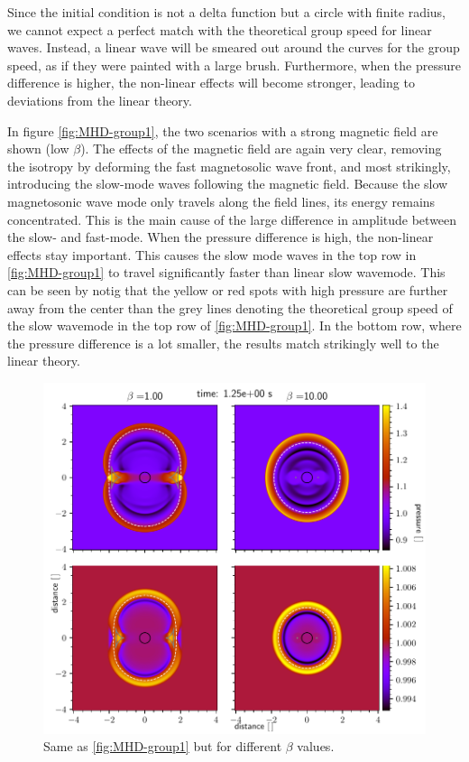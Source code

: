 Since the initial condition is not a delta function but a circle with finite radius, we cannot expect a perfect match with the theoretical group speed for linear waves.
Instead, a linear wave will be smeared out around the curves for the group speed, as if they were painted with a large brush.
Furthermore, when the pressure difference is higher, the non-linear effects will become stronger, leading to deviations from the linear theory.

In figure \cref{fig:MHD-group1}, the two scenarios with a strong magnetic field are shown (low $\beta$).
The effects of the magnetic field are again very clear, removing the isotropy by deforming the fast magnetosolic wave front, and most strikingly, introducing the slow-mode waves following the magnetic field.
Because the slow magnetosonic wave mode only travels along the field lines, its energy remains concentrated. This is the main cause of the large difference in amplitude between the slow- and fast-mode.
When the pressure difference is high, the non-linear effects stay important. 
This causes the slow mode waves in the top row in \cref{fig:MHD-group1} to travel significantly faster than linear slow wavemode.
This can be seen by notig that the yellow or red spots with high pressure are further away from the center than the grey lines denoting the theoretical group speed of the slow wavemode in the top row of \cref{fig:MHD-group1}.
In the bottom row, where the pressure difference is a lot smaller, the results match strikingly well to the linear theory.

\begin{figure}[H]
	\centering
	\includegraphics[width=\linewidth]{images/group-speed-pressure2.pdf}
	\caption{Same as \cref{fig:MHD-group1} but for different $\beta$ values.}
	\label{fig:MHD-group2}
\end{figure}

